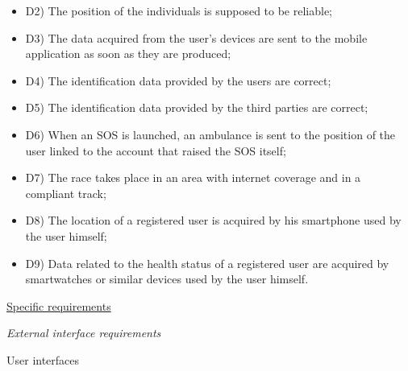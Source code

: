 \documentclass{article}
\begin{document}
\begin{legal}
\begin{legal}
\begin{legal}
{\begin{itemize}
				\item D2) The position of the individuals is supposed to be reliable;\\
				\item D3) The data acquired from the user’s devices are sent to the mobile application as soon as they are produced;\\
				\item D4) The identification data provided by the users are correct;\\
				\item D5) The identification data provided by the third parties are correct;\\
				\item D6) When an SOS is launched, an ambulance is sent to the position of the user linked to the account that raised the SOS itself;\\
				\item D7) The race takes place in an area with internet coverage and in a compliant track;\\
				\item D8) The location of a registered user is acquired by his smartphone used by the user himself;\\
				\item D9) Data related to the health status of a registered user are acquired by smartwatches or similar devices used by the user himself.\\
				\end{itemize}
			}
			\end{legal}
		\end{legal}
	
\newpage
	\item \underline{Specific requirements}
  		\begin{legal}
		\item \textit{External interface requirements}
			\begin{legal}
    		\item User interfaces \\\\
\end{legal}
\end{legal}
\end{legal}
\end{document}

